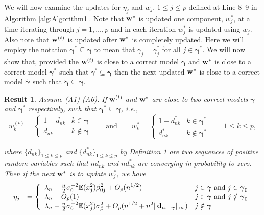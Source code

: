 \documentclass[11pt]{article}
\newtheorem{Result}{Result}
\newtheorem{Main Result}{Main Result}
\def\vectorfontone{\bf}
\def\vectorfonttwo{\boldsymbol}
\def\vd{{\vectorfontone d}}                      %
\def\vw{{\vectorfontone w}}                      %
\def\vgamma{{\vectorfonttwo \gamma}}             %
\def\bE{{\mathbb E}}                             %
\def\ds{\displaystyle}
\newcommand{\joc}[1]{{\color{black}#1}}
\begin{document}
\joc{

\noindent
We will now examine the updates for $\eta_j$ and $w_j$, $1\le j\le p$ defined at Line 8--9 in Algorithm \ref{alg:Algorithm1}. Note that $\vw^*$ is updated one component, $w^*_j$, at a time iterating through $j=1,\ldots,p$ and in each iteration $w^*_j$ is updated using $w_j$. Also note that $\vw^{(t)}$ is updated after $\vw^*$ is completely updated.
Here we will employ the notation
$\vgamma^* \subseteq \vgamma$ to mean that
$\gamma_j=\gamma_j^*$ for all $j\in \vgamma^*$.
We will now show that, provided the $\vw^{(t)}$ is close to a correct model $\vgamma$
and $\vw^{*}$ is close to a correct model
$\vgamma^*$ such that $\gamma^*\subseteq \vgamma$
then the next updated $\vw^{*}$ is close to a correct model
$\widetilde{\vgamma}$ such
that $\widetilde{\vgamma} \subseteq \vgamma$.


\smallskip
\begin{Result}\label{res:12}
	Assume (A1)-(A6). If $\vw^{(t)}$ and $\vw^{*}$
	are close to two correct models $\vgamma$ and $\vgamma^*$ respectively, such that $\vgamma^* \subseteq \vgamma$, i.e.,
	$$
	\ds w_{k}^{(t)} = \left\{ \begin{array}{ll}
	1 - d_{nk}   & k\in\vgamma \\
	d_{nk}     & k\notin\vgamma
	\end{array}\right.
	\qquad \mbox{and} \qquad
	\ds w_{k}^{*} = \left\{ \begin{array}{ll}
	1 - d_{nk}^*   & k\in\vgamma^* \\
	d_{nk}^*     & k\notin\vgamma^*
	\end{array}\right. \qquad  1\leq k\leq p,
	$$
	
	\noindent where $\{ d_{nk}  \}_{1\le k\le p}$
	and $\{ d_{nk}^*  \}_{1\le k\le p}$ by Definition 1 are
	two sequences of positive random variables such that
	$nd_{nk}$ and $nd_{nk}^*$ are converging in probability
	to zero. Then if the next $\vw^*$ is to update $w^*_j$, we have
	$$
	\begin{array}{rl}
	\ds \eta_j
	& \ds = \left\{ \begin{array}{ll}
	\ds \lambda_n + \tfrac{n}{2} \sigma^{-2}_0  \bE(x_j^2)\beta_{0j}^2
	+ O_p(n^{1/2})
	&  \mbox{$j\in \vgamma$ and $j\in\vgamma_0$}\\ %
	\ds \lambda_n + O_p(1)
	&  \mbox{$j\in \vgamma$ and $j\notin\vgamma_0$} \\ %
	\ds \lambda_n -
	\tfrac{n}{2} \sigma^{-2}_0 \bE(x_j^2)\sigma_\beta^2
	+ O_p(n^{1/2} + n^2\|\vd_{n,-\vgamma}\|_\infty)
	&  \mbox{$j\notin \vgamma$}
	\end{array} \right.
	\end{array}
	$$
	

\end{Result}}
\end{document}
